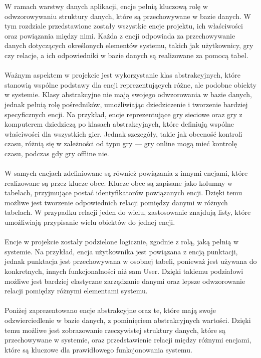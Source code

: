 \documentclass[12pt,a4paper]{article}
\begin{document}
\noindent
W ramach warstwy danych aplikacji, encje pełnią kluczową rolę w odwzorowywaniu struktury danych, które są przechowywane w bazie danych. W tym rozdziale przedstawione zostały wszystkie encje projektu, ich właściwości oraz powiązania między nimi. Każda z encji odpowiada za przechowywanie danych dotyczących określonych elementów systemu, takich jak użytkownicy, gry czy relacje, a ich odpowiedniki w bazie danych są realizowane za pomocą tabel.
\\\\
Ważnym aspektem w projekcie jest wykorzystanie klas abstrakcyjnych, które stanowią wspólne podstawy dla encji reprezentujących różne, ale podobne obiekty w systemie. Klasy abstrakcyjne nie mają swojego odwzorowania w bazie danych, jednak pełnią rolę pośredników, umożliwiając dziedziczenie i tworzenie bardziej specyficznych encji. Na przykład, encje reprezentujące gry sieciowe oraz gry z komputerem dziedziczą po klasach abstrakcyjnych, które definiują wspólne właściwości dla wszystkich gier. Jednak szczegóły, takie jak obecność kontroli czasu, różnią się w zależności od typu gry — gry online mogą mieć kontrolę czasu, podczas gdy gry offline nie.
\\\\
W samych encjach zdefiniowane są również powiązania z innymi encjami, które realizowane są przez klucze obce. Klucze obce są zapisane jako kolumny w tabelach, przyjmujące postać identyfikatorów powiązanych encji. Dzięki temu możliwe jest tworzenie odpowiednich relacji pomiędzy danymi w różnych tabelach. W przypadku relacji jeden do wielu, zastosowanie znajdują listy, które umożliwiają przypisanie wielu obiektów do jednej encji.
\\\\
Encje w projekcie zostały podzielone logicznie, zgodnie z rolą, jaką pełnią w systemie. Na przykład, encja użytkownika jest powiązana z encją punktacji, jednak punktacja jest przechowywana w osobnej tabeli, ponieważ jest używana do konkretnych, innych funkcjonalności niż sam User. Dzięki takiemu podziałowi możliwe jest bardziej elastyczne zarządzanie danymi oraz lepsze odwzorowanie relacji pomiędzy różnymi elementami systemu.
\\\\
Poniżej zaprezentowano encje abstrakcyjne oraz te, które mają swoje odzwierciedlenie w bazie danych, z pominięciem abstrakcyjnych wartości. Dzięki temu możliwe jest zobrazowanie rzeczywistej struktury danych, które są przechowywane w systemie, oraz przedstawienie relacji między różnymi encjami, które są kluczowe dla prawidłowego funkcjonowania systemu.
\end{document}
